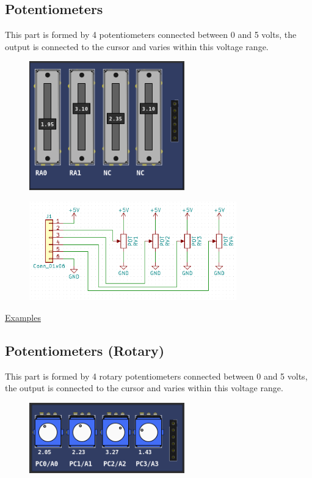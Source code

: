 \subsection{Potentiometers}

This part is formed by 4 potentiometers connected between 0 and 5 volts, the output is connected to the cursor and varies within this voltage range.
\begin{figure}[H]
\center
\includegraphics[width=0.6\textwidth]{img/part_pot.png} 
\end{figure} 

\begin{figure}[H]
\center
\includegraphics[width=0.8\textwidth]{img/part_pot_.png} 
\end{figure} 

\href{https://lcgamboa.github.io/picsimlab_examples/Parts.html\#Potentiometers}{Examples}

\subsection{Potentiometers (Rotary)}

This part is formed by 4 rotary potentiometers connected between 0 and 5 volts, the output is connected to the cursor and varies within this voltage range.
\begin{figure}[H]
\center
\includegraphics[width=0.6\textwidth]{img/part_pot_r.png} 
\end{figure} 

